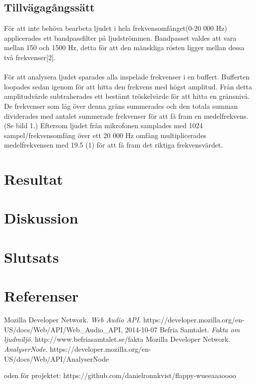 \documentclass[12pt, titlepage, twoside, a4paper]{article}
\begin{document}
\subsection{Tillvägagångssätt}
För att inte behöva bearbeta ljudet i hela frekvensomfånget(0-20 000 Hz) applicerades ett bandpassfilter på ljudströmmen. Bandpasset valdes att vara mellan 150 och 1500 Hz, detta för att den mänskliga rösten ligger mellan dessa två frekvenser[2].
\\ \\
För att analysera ljudet sparades alla inspelade frekvenser i en buffert. Bufferten loopades sedan igenom för att hitta den frekvens med högst amplitud. Från detta amplitudvärde subtraherades ett bestämt tröskelvärde för att hitta en gränsnivå. De frekvenser som låg över denna gräns summerades och den totala summan dividerades med antalet summerade frekvenser för att få fram en medelfrekvens. (Se bild 1.) Eftersom ljudet från mikrofonen samplades med 1024 sampel/frekvensomfång över ett 20 000 Hz omfång multiplicerades medelfrekvensen med 19.5 (1) för att få fram det riktiga frekvensvärdet.
\section{Resultat}
\section{Diskussion}
\section{Slutsats}
\section{Referenser}
\renewcommand{\addcontentsline}[3]{}%
\renewcommand{\section}[2]{}%
\begin{thebibliography}{1}
  Mozilla Developer Network.
  \emph{Web Audio API.}
  https://developer.mozilla.org/en-US/docs/Web/API/Web\_Audio\_API, 2014-10-07
  Befria Samtalet.
  \emph{Fakta om ljudmiljö.}
  http://www.befriasamtalet.se/fakta
  Mozilla Developer Network.
  \emph{AnalyserNode.}
  https://developer.mozilla.org/en-US/docs/Web/API/AnalyserNode
\end{thebibliography}
\section{Bilagor}
Koden för projektet: https://github.com/danielronnkvist/flappy-wueeaaaoooo
\end{document}

